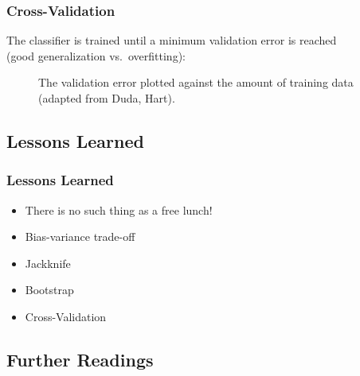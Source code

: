 \begin{frame}
  \frametitle{Cross-Validation \cont}

  The classifier is trained until a minimum validation error is reached \\
  (good generalization vs.\ overfitting):
  
  \begin{figure}
    \centering
    \resizebox{.6\linewidth}{!}{
      
    }
    \caption{\footnotesize{The validation error plotted against the amount of training data (adapted from Duda, Hart).}}
  \end{figure}
\end{frame}


\subsection{Lessons Learned}

\begin{frame}
  \frametitle{Lessons Learned}
  
  \begin{itemize}
    \item There is no such thing as a free lunch! \\[.3cm]
    \item Bias-variance trade-off \\[.3cm]
    \item Jackknife \\[.3cm]
    \item Bootstrap \\[.3cm]
    \item Cross-Validation
  \end{itemize}
\end{frame}



\subsection{Further Readings}

